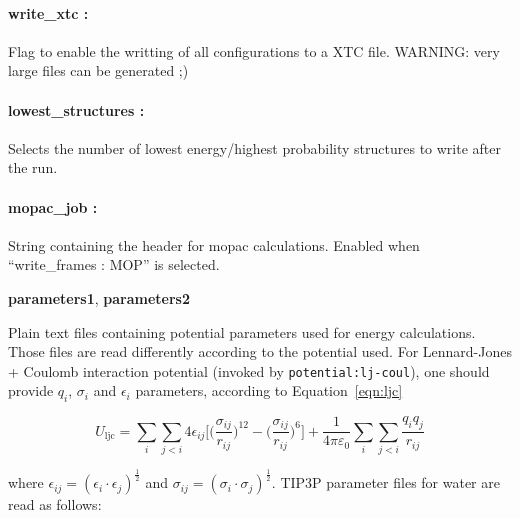 \documentclass[10pt,a4paper]{report}
\begin{document}
\paragraph{write\_xtc :} 

Flag to enable the writting of all configurations to a XTC file. WARNING: very large files can 
be generated ;) 
  
\paragraph{lowest\_structures :} 

Selects the number of lowest energy/highest probability structures to write after the run. 
  
\paragraph{mopac\_job :} 

String containing the header for mopac calculations. Enabled when ``write\_frames : MOP'' is selected.


  \textbf{parameters1}, \textbf{parameters2} 

  Plain text files containing 
potential parameters used for energy calculations. Those files are read differently 
according to the potential used. For Lennard-Jones + Coulomb interaction potential 
(invoked by \texttt{potential:lj-coul}), one should provide $q_{i}$, $\sigma_{i}$ 
and $\epsilon_{i}$ parameters, according to Equation~\ref{eqn:ljc}

\begin{equation}
  \label{eqn:ljc}
  U_{\textrm{ljc}} =  
  \sum\limits_{i} \sum\limits_{j<i}4\epsilon_{ij}\bigg[\bigg(\frac{\sigma_{ij}}{r_{ij}}\bigg)^{\!\!12}
  -\bigg(\frac{\sigma_{ij}}{r_{ij}}\bigg)^{\!\!6}\bigg]
	+\frac{1}{4\pi\varepsilon_{0}}\sum\limits_{i} \sum\limits_{j<i}\frac{q_{i}q_{j}}{r_{ij}}
\end{equation}

where $\epsilon_{ij} = ( \epsilon_{i} \cdot \epsilon_{j})^\frac{1}{2}$ and
$\sigma_{ij} = ( \sigma_{i} \cdot \sigma_{j})^\frac{1}{2}$. TIP3P parameter files for 
water are read as follows:
\end{document}
